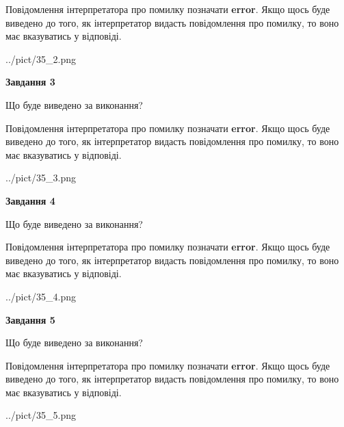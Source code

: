 \documentclass[12pt, ukrainian]{article}
\begin{document}
{\begin {large}
Повідомлення інтерпретатора про помилку позначати \textbf{error}.
Якщо щось буде виведено до того, як інтерпретатор видасть повідомлення про помилку, 
то воно має вказуватись у відповіді. \par


\begin{center}
	{../pict/35_2.png}
\end{center}
\newpage

{\begin {center}\textbf{Завдання 3}\end {center}}\par
Що буде виведено за виконання?

Повідомлення інтерпретатора про помилку позначати \textbf{error}.
Якщо щось буде виведено до того, як інтерпретатор видасть повідомлення про помилку, 
то воно має вказуватись у відповіді. \par


\begin{center}
	{../pict/35_3.png}
\end{center}
\newpage

{\begin {center}\textbf{Завдання 4}\end {center}}\par
Що буде виведено за виконання?

Повідомлення інтерпретатора про помилку позначати \textbf{error}.
Якщо щось буде виведено до того, як інтерпретатор видасть повідомлення про помилку, 
то воно має вказуватись у відповіді. \par


\begin{center}
	{../pict/35_4.png}
\end{center}
\newpage

{\begin {center}\textbf{Завдання 5}\end {center}}\par
Що буде виведено за виконання?

Повідомлення інтерпретатора про помилку позначати \textbf{error}.
Якщо щось буде виведено до того, як інтерпретатор видасть повідомлення про помилку, 
то воно має вказуватись у відповіді. \par


\begin{center}
	{../pict/35_5.png}
\end{center}
\newpage


\end{large}}
\end{document}
